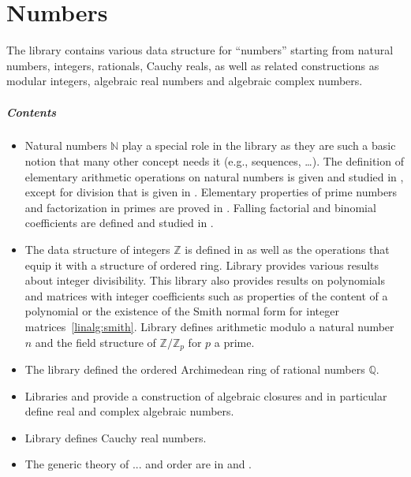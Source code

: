 \chapter{Numbers}

The library contains various data structure for ``numbers''
starting from natural numbers, integers, rationals, Cauchy reals, as well as
related constructions as modular integers, algebraic real numbers and algebraic
complex numbers.

\paragraph{Contents}
\begin{itemize}

\item
Natural numbers $\mathbb{N}$ play a special role in the \mcbMC{} library as they
are such a basic notion that many other concept needs it (e.g., sequences, \ldots).
The definition of elementary arithmetic operations on natural numbers
is given and studied in , except for division
that is given in .  Elementary properties of
prime numbers and factorization in primes are proved in
.  Falling factorial and binomial coefficients are defined
and studied in .

\item
The data structure of integers $\mathbb{Z}$ is defined in 
as well as the operations that equip it with a structure of
ordered ring. Library  provides various
results about integer divisibility.  This library also provides
results on polynomials and matrices with integer coefficients
such as properties of the content of a polynomial or the
existence of the Smith normal form for integer matrices~\ref{linalg:smith}.
Library  defines arithmetic modulo a natural number $n$
and the field structure of $\mathbb{Z}/\mathbb{Z}_p$ for $p$ a prime.

\item
The library  defined the ordered Archimedean ring of
rational numbers $\mathbb{Q}$.

\item
Libraries  and 
provide a construction of algebraic closures and in particular define
real and complex algebraic numbers.

\item
Library  defines Cauchy real numbers.

\item
The generic theory of ... and order are in 
and .

\end{itemize}

